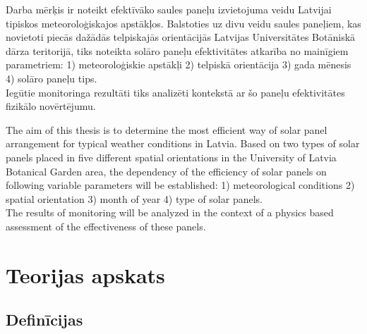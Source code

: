 \documentclass[singlespacing, latexmargins]{ludis}
\begin{document}
\maketitle

\begin{abstract-lv}
Darba mērķis ir noteikt efektīvāko saules paneļu izvietojuma veidu Latvijai tipiskos meteoroloģiskajos apstākļos. 
Balstoties uz divu veidu saules paneļiem, kas novietoti piecās dažādās telpiskajās orientācijās Latvijas Universitātes Botāniskā dārza teritorijā, tiks noteikta solāro paneļu efektivitātes atkarība no mainīgiem parametriem:
1) meteoroloģiskie apstākļi
2) telpiskā orientācija
3) gada mēnesis
4) solāro paneļu tips. \\
Iegūtie monitoringa rezultāti tiks analizēti kontekstā ar šo paneļu efektivitātes fizikālo novērtējumu.\\

\end{abstract-lv}

\begin{abstract-en}
The aim of this thesis is to determine the most efficient way of solar panel arrangement for typical weather conditions in Latvia.
Based on two types of solar panels placed in five different spatial orientations in the University of Latvia Botanical Garden area, the dependency of the efficiency of solar panels on following variable parameters will be established:
1) meteorological conditions
2) spatial orientation
3) month of year
4) type of solar panels.\\
The results of monitoring will be analyzed in the context of a physics based assessment of the effectiveness of these panels.\\

\end{abstract-en}

\tableofcontents





\chapter{Teorijas apskats}


\section{Definīcijas}

\end{document}
